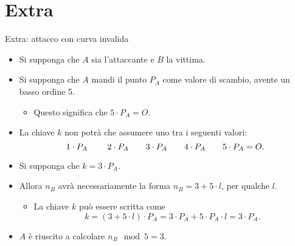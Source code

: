\documentclass[11pt,svgnames,smaller,aspectratio=169,italian]{beamer}
\newcommand{\extrabegin}{
   \newcounter{finalframe}
   \setcounter{finalframe}{\value{framenumber}}
}
\newcommand{\extraend}{
   \setcounter{framenumber}{\value{finalframe}}
}
\begin{document}
\extrabegin

\section*{Extra}
\begin{frame}
	\sectionpage
	\centering
\end{frame}

\begin{frame}{Extra: attacco con curva invalida}
	\begin{itemize}
		\item Si supponga che $A$ sia l'attaccante e $B$ la vittima.
		\item Si supponga che $A$ mandi il punto $P_{A}$ come valore di scambio, avente un basso ordine 5.
			\begin{itemize}
				\item Questo significa che $5 \cdot P_{A} = O$.
			\end{itemize}
		\item La chiave $k$ non potrà che assumere uno tra i seguenti valori:
			\begin{equation*}
				1 \cdot P_{A} \quad\text{\emph{}}\quad 2 \cdot P_{A} \quad\text{\emph{}}\quad 3 \cdot P_{A} \quad\text{\emph{}}\quad 4 \cdot P_{A} \quad\text{\emph{}}\quad 5 \cdot P_{A} = O.
			\end{equation*}
		\item Si supponga che $k = 3 \cdot P_{A}$.
		\item Allora $n_{B}$ avrà necessariamente la forma $n_{B} = 3 + 5 \cdot l$, per qualche $l$.
			\begin{itemize}
				\item La chiave $k$ può essere scritta come
					\begin{equation*}
						k = (3 + 5 \cdot l) \cdot P_{A}  = 3 \cdot P_{A} + 5 \cdot P_{A} \cdot l = 3 \cdot P_{A}.
					\end{equation*}
			\end{itemize}
		\item $A$ è riuscito a calcolare $n_{B} \mod 5 = 3$.
	\end{itemize}
\end{frame}

\extraend
















\end{document}
